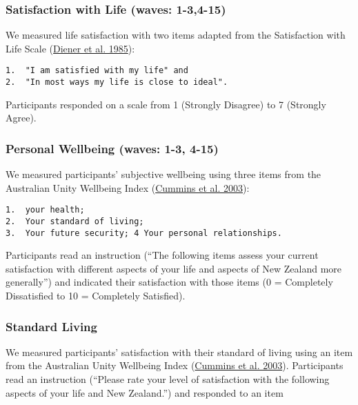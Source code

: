 \documentclass[
  singlecolumn]{report}
\begin{document}
\hypertarget{satisfaction-with-life-waves-1-34-15}{%
\subsubsection{Satisfaction with Life (waves:
1-3,4-15)}\label{satisfaction-with-life-waves-1-34-15}}

We measured life satisfaction with two items adapted from the
Satisfaction with Life Scale (\protect\hyperlink{ref-diener1985}{Diener
et al. 1985}):

\begin{verbatim}
1.  "I am satisfied with my life" and
2.  "In most ways my life is close to ideal".
\end{verbatim}

Participants responded on a scale from 1 (Strongly Disagree) to 7
(Strongly Agree).

\hypertarget{personal-wellbeing-waves-1-3-4-15}{%
\subsubsection{Personal Wellbeing (waves: 1-3,
4-15)}\label{personal-wellbeing-waves-1-3-4-15}}

We measured participants' subjective wellbeing using three items from
the Australian Unity Wellbeing Index
(\protect\hyperlink{ref-cummins_developing_2003}{Cummins et al. 2003}):

\begin{verbatim}
1.  your health;
2.  Your standard of living;
3.  Your future security; 4 Your personal relationships.
\end{verbatim}

Participants read an instruction (``The following items assess your
current satisfaction with different aspects of your life and aspects of
New Zealand more generally'') and indicated their satisfaction with
those items (0 = Completely Dissatisfied to 10 = Completely Satisfied).

\hypertarget{standard-living}{%
\subsubsection{Standard Living}\label{standard-living}}

We measured participants' satisfaction with their standard of living
using an item from the Australian Unity Wellbeing Index
(\protect\hyperlink{ref-cummins_developing_2003}{Cummins et al. 2003}).
Participants read an instruction (``Please rate your level of
satisfaction with the following aspects of your life and New Zealand.'')
and responded to an item
\end{document}

